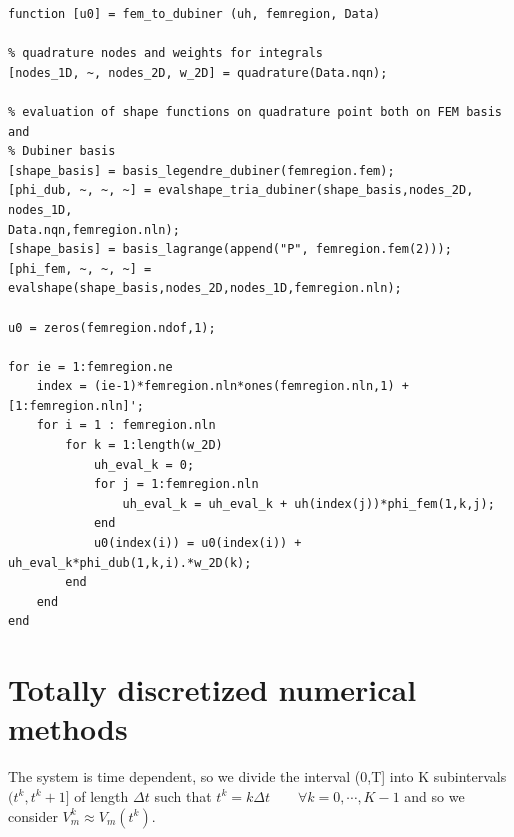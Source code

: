 \documentclass[a4paper,12pt]{article}
\begin{document}
\begin{verbatim}
function [u0] = fem_to_dubiner (uh, femregion, Data)

% quadrature nodes and weights for integrals
[nodes_1D, ~, nodes_2D, w_2D] = quadrature(Data.nqn);

% evaluation of shape functions on quadrature point both on FEM basis and
% Dubiner basis
[shape_basis] = basis_legendre_dubiner(femregion.fem);
[phi_dub, ~, ~, ~] = evalshape_tria_dubiner(shape_basis,nodes_2D, nodes_1D,
Data.nqn,femregion.nln);
[shape_basis] = basis_lagrange(append("P", femregion.fem(2)));
[phi_fem, ~, ~, ~] = evalshape(shape_basis,nodes_2D,nodes_1D,femregion.nln);

u0 = zeros(femregion.ndof,1);

for ie = 1:femregion.ne
    index = (ie-1)*femregion.nln*ones(femregion.nln,1) + [1:femregion.nln]';
    for i = 1 : femregion.nln
        for k = 1:length(w_2D) 
            uh_eval_k = 0;
            for j = 1:femregion.nln
                uh_eval_k = uh_eval_k + uh(index(j))*phi_fem(1,k,j);
            end
            u0(index(i)) = u0(index(i)) + uh_eval_k*phi_dub(1,k,i).*w_2D(k);
        end
    end    
end
\end{verbatim}

\section{Totally discretized numerical methods}
The system is time dependent, so we divide the interval (0,T] into K subintervals $(t^k,t^k+1]$ of length $\Delta t$ such that $t^k=k \Delta t \qquad \forall k=0,\cdots,K-1$ and so we consider $V_m^k\approx V_m(t^k)$.
\end{document}
